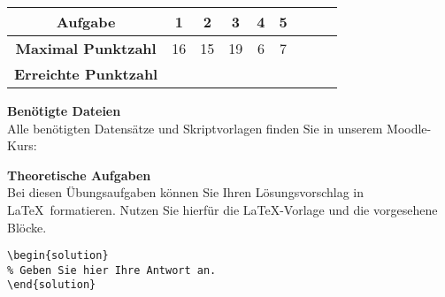 
\begin{table}[h!]
\centering
\begin{tabular}{c|c|c|c|c|c|c|c|c}
\toprule
\textbf{Aufgabe}              & 1  & 2  & 3  & 4 & 5 \\ \hline
\textbf{Maximal Punktzahl}    & 16 & 15 & 19 & 6 & 7  \\ \hline
\textbf{Erreichte Punktzahl}  &   &   &   &   &    \\
\bottomrule
\end{tabular}
\end{table}

\flushleft

\par \textbf{Benötigte Dateien}\\
Alle benötigten Datensätze und Skriptvorlagen finden Sie in unserem Moodle-Kurs: 

\textbf{Theoretische Aufgaben}\\
Bei diesen Übungsaufgaben können Sie Ihren Lösungsvorschlag in \LaTeX~formatieren.
Nutzen Sie hierfür die \LaTeX-Vorlage und die vorgesehene Blöcke.
\begin{verbatim}
\begin{solution}
% Geben Sie hier Ihre Antwort an.
\end{solution}
\end{verbatim}
